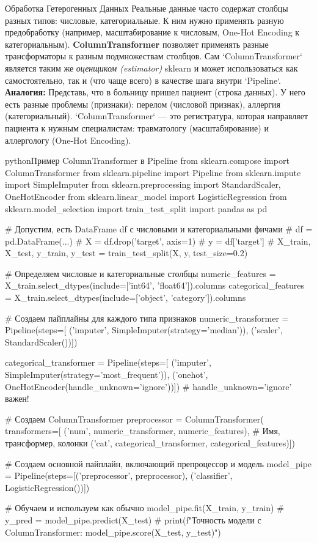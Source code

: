 \begin{myexampleblock}{Обработка Гетерогенных Данных}
    Реальные данные часто содержат столбцы разных типов: числовые, категориальные. К ним нужно применять разную предобработку (например, масштабирование к числовым, One-Hot Encoding к категориальным). \textbf{ColumnTransformer} позволяет применять разные трансформаторы к разным подмножествам столбцов. Сам `ColumnTransformer` является таким же \textit{оценщиком (estimator)} sklearn и может использоваться как самостоятельно, так и (что чаще всего) в качестве шага внутри `Pipeline`.
    \textbf{Аналогия:} Представь, что в больницу пришел пациент (строка данных). У него есть разные проблемы (признаки): перелом (числовой признак), аллергия (категориальный). `ColumnTransformer` — это регистратура, которая направляет пациента к нужным специалистам: травматологу (масштабирование) и аллергологу (One-Hot Encoding).
\end{myexampleblock}

\begin{codebox}{python}{Пример ColumnTransformer в Pipeline}
from sklearn.compose import ColumnTransformer
from sklearn.pipeline import Pipeline
from sklearn.impute import SimpleImputer
from sklearn.preprocessing import StandardScaler, OneHotEncoder
from sklearn.linear_model import LogisticRegression
from sklearn.model_selection import train_test_split
import pandas as pd

# Допустим, есть DataFrame df с числовыми и категориальными фичами
# df = pd.DataFrame(...)
# X = df.drop('target', axis=1)
# y = df['target']
# X_train, X_test, y_train, y_test = train_test_split(X, y, test_size=0.2)

# Определяем числовые и категориальные столбцы
numeric_features = X_train.select_dtypes(include=['int64', 'float64']).columns
categorical_features = X_train.select_dtypes(include=['object', 'category']).columns

# Создаем пайплайны для каждого типа признаков
numeric_transformer = Pipeline(steps=[
    ('imputer', SimpleImputer(strategy='median')),
    ('scaler', StandardScaler())])

categorical_transformer = Pipeline(steps=[
    ('imputer', SimpleImputer(strategy='most_frequent')),
    ('onehot', OneHotEncoder(handle_unknown='ignore'))]) # handle_unknown='ignore' важен!

# Создаем ColumnTransformer
preprocessor = ColumnTransformer(
    transformers=[
        ('num', numeric_transformer, numeric_features), # Имя, трансформер, колонки
        ('cat', categorical_transformer, categorical_features)])

# Создаем основной пайплайн, включающий препроцессор и модель
model_pipe = Pipeline(steps=[('preprocessor', preprocessor),
                           ('classifier', LogisticRegression())])

# Обучаем и используем как обычно
model_pipe.fit(X_train, y_train)
# y_pred = model_pipe.predict(X_test)
# print(f"Точность модели с ColumnTransformer: {model_pipe.score(X_test, y_test)}")
\end{codebox}

